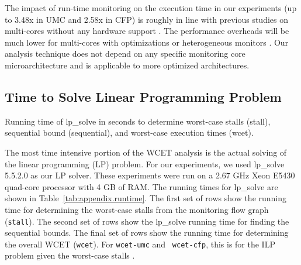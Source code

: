 The impact of run-time monitoring on the execution time in our experiments
(up to 3.48x in UMC and 2.58x in CFP) is roughly in line with previous studies
on multi-cores without any hardware support \cite{chen08-lba, nagarajan08-dift}. 
The performance overheads will be much lower for multi-cores with optimizations 
\cite{chen08-lba} or heterogeneous monitors \cite{flexcore-micro10}. 
Our analysis technique does not depend on any specific monitoring core
microarchitecture and is applicable to more optimized architectures.



\subsection{Time to Solve Linear Programming Problem}
\label{sec:lptime}

\begin{table}[htb]
  \begin{center}
    \begin{small}
    
    \end{small}
    \vspace{-0.1in}
    \caption{Running time of lp\_solve in seconds to determine worst-case stalls
    (stall), sequential bound (sequential), and worst-case execution times (wcet).}
    \label{tab:appendix.runtime}
    \vspace{-0.2in}
  \end{center}
\end{table}

The most time intensive portion of the WCET analysis is the actual solving of
the linear programming (LP) problem. For our experiments, we used lp\_solve
5.5.2.0 \cite{lpsolve} as our LP solver. These experiments were run on a 2.67
GHz Xeon E5430 quad-core processor with 4 GB of RAM. The running times for
lp\_solve are shown in Table~\ref{tab:appendix.runtime}.  The first set of rows
show the running time for determining the worst-case stalls from the monitoring flow
graph ({\tt stall}). The second set of rows show the lp\_solve running time for
finding the sequential bounds. The final set of rows show the running time for
determining the overall WCET ({\tt wcet}). For {\tt wcet-umc} and {\tt
wcet-cfp}, this is for the ILP problem given the worst-case stalls .

